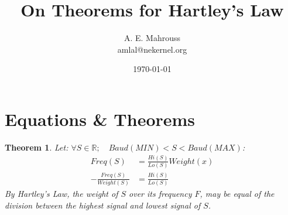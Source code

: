 \documentclass[10pt, twocolumn]{article}
\title{%
  \vspace{-1.5em}%
  \large\textbf{On Theorems for Hartley's Law}%
}
\author{A. E. Mahrouss\\amlal@nekernel.org}
\date{\today}
\theoremstyle{plain}
\newtheorem{theorem}{Theorem}[section]
\theoremstyle{definition}
\theoremstyle{remark}
\begin{document}
\twocolumn[{%
  \maketitle
  \vspace{-0.5em}
  \vspace{0.8em}
  \rule{\linewidth}{0.4pt}
  \vspace{1em}
}]

\section{Equations \& Theorems}

\begin{theorem}
Let:
$\forall S \in \mathbb{R}; \quad Baud(MIN) < S < Baud(MAX)$:
\begin{align*}
	Freq(S) &= \frac{Hi(S)}{Lo(S)} Weight(x)\\
	-\frac{Freq(S)}{Weight(S)} &= \frac{Hi(S)}{Lo(S)}
\end{align*}
By Hartley's Law, the weight of $S$ over its frequency $F$, may be equal of the division between the highest signal and lowest signal of $S$.
\end{theorem}

\nocite{*}



\end{document}
